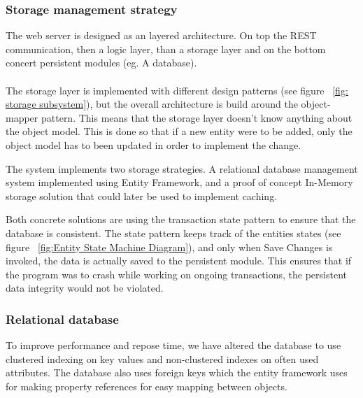 \subsubsection{Storage management strategy}
The web server is designed as an layered architecture. On top the REST communication, then a logic layer, than a storage layer and on the bottom concert persistent modules (eg. A database).\\\\
The storage layer is implemented with different design patterns (see figure ~\ref{fig: storage subsystem}), but the overall architecture is build around the object-mapper pattern. This means that the storage layer doesn't know anything about the object model. This is done so that if a new entity were to be added, only the object model has to been updated in order to implement the change. 

The system implements two storage strategies. A relational database management system implemented using Entity Framework, and a proof of concept In-Memory storage solution that could later be used to implement caching. 

Both concrete solutions are using the transaction state pattern to ensure that the database is consistent. The state pattern keeps track of the entities states (see figure ~\ref{fig:Entity State Machine Diagram}), and only when Save Changes is invoked, the data is actually saved to the persistent module. This ensures that if the program was to crash while working on ongoing transactions, the persistent data integrity would not be violated.  

\subsubsection{Relational database}
To improve performance and repose time, we have altered the database to use clustered indexing on key values and non-clustered indexes on often used attributes. The database also uses foreign keys which the entity framework uses for making property references for easy mapping between objects. 


